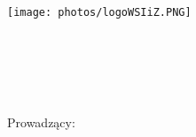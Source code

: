 
\noindent
\parbox{65mm}{\texttt{[image: photos/logoWSIiZ.PNG]}}

\vspace{10mm}
\begin{center}
{\Large{}\textbf{\wydzial}}
\end{center}
\vspace{10mm}
\noindent
\hspace{30mm}{\Large{}\textbf{\kierunek}}\\

\noindent
\hspace{30mm}{\Large{}\textbf{\specjalnosc}}
\vspace{30mm}
\begin{center}
	{\large{}\autor}\\
	{\large{}\album}\\
	\vspace{15pt}
	{\huge{}\textbf{\textit{\temat}}}\\
	\vspace{20pt}
	{\normalsize{}Prowadzący: \promotor}\\
	\vspace{100pt}
	{\LARGE{}\textbf{\typpracy}}\\
	\vspace{190pt}
	{\large{}\textbf{\miasto {} \rok}}
\end{center}

\thispagestyle{empty}

\newpage



\tableofcontents
\thispagestyle{empty}
\newpage

